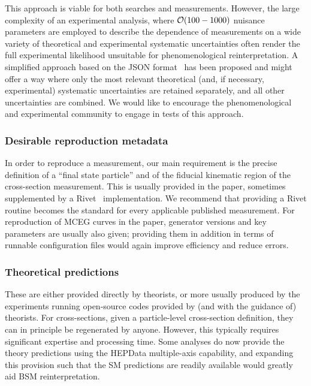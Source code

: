 \documentclass[a4paper,aps,prd,longbibliography,notitlepage,showpacs,amsmath,amssymb,superscriptaddress,nofootinbib,floatfix,11pt,preprintnumbers]{revtex4-1-mod}
\newcommand{\hepdata}{\textsf{HEPData}\xspace}
\newcommand{\json}{\textsf{JSON}\xspace}
\newcommand{\rivet}{\textsf{Rivet}\xspace}
\begin{document}
This approach is viable for both searches and measurements. However, the large complexity of an experimental analysis, where ${\cal O}(100 - 1000)$ nuisance parameters are employed to describe the dependence of measurements on a wide variety of theoretical and experimental systematic uncertainties often render the full experimental likelihood unsuitable for phenomenological reinterpretation. A simplified approach based on the \json format~\cite{ATL-PHYS-PUB-2019-029} has been proposed and might offer a way where only the most relevant theoretical (and, if necessary, experimental) systematic uncertainties are retained separately, and all other uncertainties are combined. We would like to encourage the phenomenological and experimental community to engage in tests of this approach. \\

\subsubsection{Desirable reproduction metadata}
In order to reproduce a measurement, our main requirement is the precise definition of a ``final state particle'' and of the fiducial kinematic region of the cross-section measurement. This is usually provided in the paper, sometimes supplemented by a \rivet~\cite{Buckley:2010ar,Bierlich:2019rhm} implementation.
We recommend that providing a \rivet routine becomes the standard for every applicable published measurement.
For reproduction of MCEG curves in the paper, generator versions and key parameters are usually also given; providing them in addition in terms of runnable configuration files would again improve efficiency and reduce errors.\\

\subsubsection{Theoretical predictions} These are either provided directly by theorists, or more usually produced by the experiments running open-source codes provided by (and with the guidance of) theorists. For cross-sections, given a particle-level cross-section definition, they can in principle be regenerated by anyone. However, this typically requires significant expertise and processing time. Some analyses do now provide the theory predictions using the \hepdata multiple-axis capability, and expanding this provision such that the SM predictions are readily available would greatly aid BSM reinterpretation.
\end{document}
